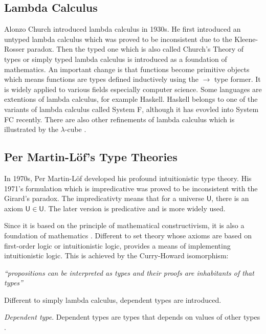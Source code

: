 \subsection{Lambda Calculus}

Alonzo Church introduced lambda calculus in 1930s. He first introduced
an untyped lambda calculus which was proved to be inconsistent due to
the Kleene-Rosser paradox. Then the typed one which is also called
Church's Theory of types or simply typed lambda calculus is
introduced as a foundation of mathematics. An important change is that functions become primitive objects which means functions are types defined inductively using the $\rightarrow$ type former. It is widely applied to
various fields especially computer science. Some languages are extentions of lambda calculus, for example Haskell. Haskell belongs to one of the variants of lambda calculus called System F, although it has evovled into System FC recently. There are also other refinements of lambda calculus which is illustrated by the $\lambda$-cube \cite{lambda-cube}.


\subsection{Per Martin-L\"{o}f's Type Theories}

In 1970s, Per Martin-L\"{o}f \cite{per:71,per:82}  developed his profound intuitionistic type theory. His 1971's formulation which is impredicative was proved to be inconsistent with the Girard's paradox. The impredicativty means that for a universe $\mathsf{U}$, there is an axiom $\mathsf{U} \in \mathsf{U}$\cite{Girard's}. The later version is predicative and is more widely used.

Since it is based on the principle of mathematical
constructivism, it is also a foundation of mathematics \cite{bishop?}. Different to set theory whose axioms are based on first-order logic or intuitionistic logic, \mltt provides a means of implementing intuitionistic logic. This is achieved by the Curry-Howard
isomorphism:

\emph{``propositions can be interpreted as types and their
  proofs are inhabitants of that types''} 


Different to simply lambda calculus, dependent types are introduced.

\begin{definition}\label{dpty}
\textit{Dependent type}. Dependent types are types that depends on values of other types \cite{dtw}. 
\end{definition}

